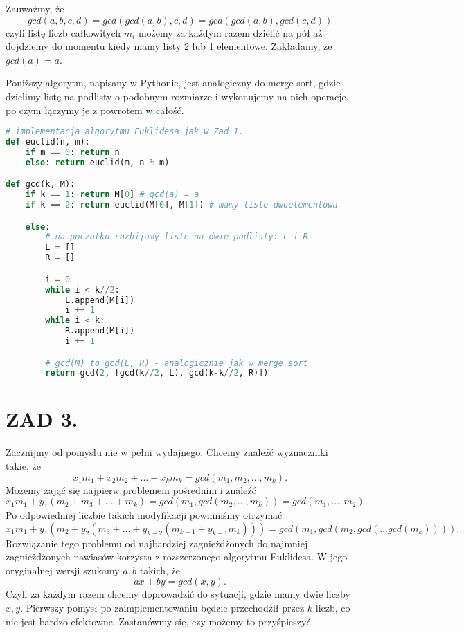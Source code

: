 \documentclass{article}[13pt]
\begin{document}
Zauważmy, że
$$gcd(a, b, c, d)=gcd(gcd(a, b), c, d)=gcd(gcd(a, b), gcd(c, d))$$
czyli listę liczb całkowitych $m_i$ możemy za każdym razem dzielić na pół aż dojdziemy do momentu kiedy mamy listy 2 lub 1 elementowe. Zakładamy, że $gcd(a)=a$. 

Poniższy algorytm, napisany w Pythonie, jest analogiczny do merge sort, gdzie dzielimy listę na podlisty o podobnym rozmiarze i wykonujemy na nich operacje, po czym łączymy je z powrotem w całość.

\begin{lstlisting}[language=Python]
# implementacja algorytmu Euklidesa jak w Zad 1.
def euclid(n, m):
    if m == 0: return n
    else: return euclid(m, n % m)

def gcd(k, M):
    if k == 1: return M[0] # gcd(a) = a
    if k == 2: return euclid(M[0], M[1]) # mamy liste dwuelementowa

    else: 
        # na poczatku rozbijamy liste na dwie podlisty: L i R
        L = []
        R = []

        i = 0
        while i < k//2:
            L.append(M[i])
            i += 1
        while i < k:
            R.append(M[i])
            i += 1

        # gcd(M) to gcd(L, R) - analogicznie jak w merge sort
        return gcd(2, [gcd(k//2, L), gcd(k-k//2, R)])
\end{lstlisting}

\section*{ZAD 3.}

Zacznijmy od pomysłu nie w pełni wydajnego. Chcemy znaleźć wyznaczniki takie, że
$$x_1m_1+x_2m_2+...+x_km_k=gcd(m_1,m_2,...,m_k).$$
Możemy zająć się najpierw problemem pośrednim i znaleźć
$$x_1m_1+y_1(m_2+m_3+...+m_k)=gcd(m_1, gcd(m_2,...,m_k))=gcd(m_1,...,m_2).$$
Po odpowiedniej liczbie takich modyfikacji powinniśmy otrzymać
$$x_1m_1+y_1(m_2+y_2(m_3+...+y_{k-2}(m_{k-1}+y_{k-1}m_k)))=gcd(m_1,gcd(m_2,gcd(...gcd(m_k)))).$$
Rozwiązanie tego problemu od najbardziej zagnieżdżonych do najmniej zagnieżdżonych nawiasów korzysta z rozszerzonego algorytmu Euklidesa. W jego oryginalnej wersji szukamy $a,b$ takich, że
$$ax+by=gcd(x,y).$$
Czyli za każdym razem chcemy doprowadzić do sytuacji, gdzie mamy dwie liczby $x,y$. Pierwszy pomysł po zaimplementowaniu będzie przechodził przez $k$ liczb, co nie jest bardzo efektowne. Zastanówmy się, czy możemy to przyśpieszyć.
\end{document}
